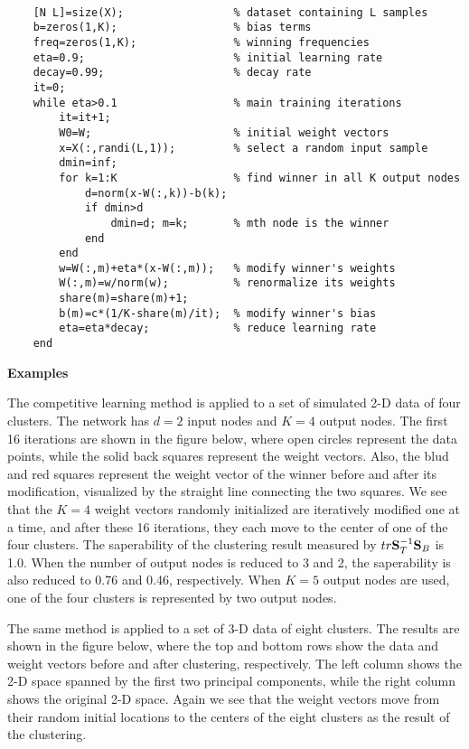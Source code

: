 \documentclass{article}
\begin{document}
\begin{verbatim}

    [N L]=size(X);                 % dataset containing L samples
    b=zeros(1,K);                  % bias terms
    freq=zeros(1,K);               % winning frequencies
    eta=0.9;                       % initial learning rate
    decay=0.99;                    % decay rate
    it=0;
    while eta>0.1                  % main training iterations
        it=it+1;
        W0=W;                      % initial weight vectors          
        x=X(:,randi(L,1));         % select a random input sample
        dmin=inf;
        for k=1:K                  % find winner in all K output nodes
            d=norm(x-W(:,k))-b(k);
            if dmin>d
                dmin=d; m=k;       % mth node is the winner
            end
        end   
        w=W(:,m)+eta*(x-W(:,m));   % modify winner's weights
        W(:,m)=w/norm(w);          % renormalize its weights   
        share(m)=share(m)+1;
        b(m)=c*(1/K-share(m)/it);  % modify winner's bias 
        eta=eta*decay;             % reduce learning rate 
    end

\end{verbatim}


{\bf Examples}

The competitive learning method is applied to a set of simulated 2-D
data of four clusters. The network has $d=2$ input nodes and $K=4$ output
nodes. The first 16 iterations are shown in the figure below, where open
circles represent the data points, while the solid back squares represent
the weight vectors. Also, the blud and red squares represent the weight
vector of the winner before and after its modification, visualized by the
straight line connecting the two squares. We see that the $K=4$ weight
vectors randomly initialized are iteratively modified one at a time, and
after these 16 iterations, they each move to the center of one of the
four clusters. The saperability of the clustering result measured by
$tr{\bf S}_T^{-1}{\bf S}_B$ is 1.0. When the number of output nodes is
reduced to 3 and 2, the saperability is also reduced to 0.76 and 0.46,
respectively. When $K=5$ output nodes are used, one of the four clusters
is represented by two output nodes.


The same method is applied to a set of 3-D data of eight clusters. The
results are shown in the figure below, where the top and bottom rows
show the data and weight vectors before and after clustering, respectively.
The left column shows the 2-D space spanned by the first two principal
components, while the right column shows the original 2-D space. Again
we see that the weight vectors move from their random initial locations
to the centers of the eight clusters as the result of the clustering.
\end{document}
